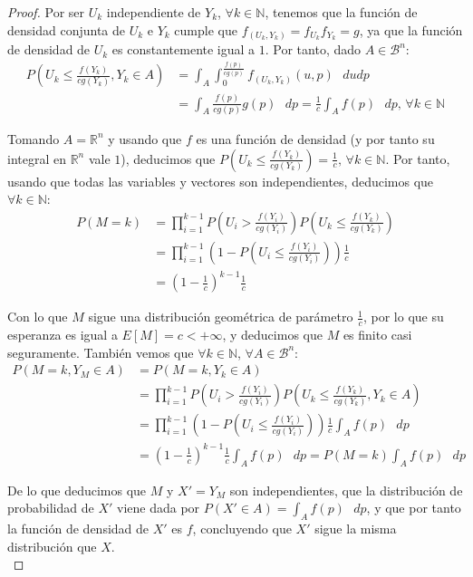 \begin{proof}
Por ser $U_k$ independiente de $Y_k$, $\forall k\in\mathds{N}$, tenemos que la función de densidad conjunta de $U_k$ e $Y_k$ cumple que $f_{(U_k,Y_k)}=f_{U_k}f_{Y_k} = g$, ya que la función de densidad de $U_k$ es constantemente igual a $1$. Por tanto, dado $A \in \mathscr{B}^n$:
\begin{align*}
P(U_k\leq \frac{f(Y_k)}{cg(Y_k)}, Y_k\in A) &= \int_{A} \int_0^{\frac{f(p)}{cg(p)}} f_{(U_k,Y_k)}(u,p)\text{ }dudp\\
&= \int_{A} \frac{f(p)}{cg(p)} g(p)\text{ } dp = \frac{1}{c}\int_{A} f(p)\text{ } dp  \text{, }\forall k\in\mathds{N}
\end{align*}

Tomando $A=\mathds{R}^n$ y usando que $f$ es una función de densidad (y por tanto su integral en $\mathds{R}^n$ vale $1$), deducimos que $P(U_k\leq \frac{f(Y_k)}{cg(Y_k)}) = \frac{1}{c}\text{, }\forall k\in\mathds{N}$. Por tanto, usando que todas las variables y vectores son independientes, deducimos que $\forall k\in\mathds{N}$:
\begin{align*}
P(M=k)&=\prod_{i=1}^{k-1}P(U_i > \frac{f(Y_i)}{cg(Y_i)}) P(U_k\leq \frac{f(Y_k)}{cg(Y_k)})\\
&=\prod_{i=1}^{k-1}(1-P(U_i \leq \frac{f(Y_i)}{cg(Y_i)})) \frac{1}{c}\\
&=(1-\frac{1}{c})^{k-1}\frac{1}{c}
\end{align*}

Con lo que $M$ sigue una distribución geométrica de parámetro $\frac{1}{c}$, por lo que su esperanza es igual a $E[M] = c < +\infty$, y deducimos que $M$ es finito casi seguramente. También vemos que $\forall k\in\mathds{N}$, $\forall A \in \mathscr{B}^n$:
\begin{align*}
P(M=k, Y_M\in A) &= P(M=k,Y_k\in A)\\
&=\prod_{i=1}^{k-1}P(U_i > \frac{f(Y_i)}{cg(Y_i)}) P(U_k\leq \frac{f(Y_k)}{cg(Y_k)}, Y_k\in A)\\
&=\prod_{i=1}^{k-1}(1-P(U_i \leq \frac{f(Y_i)}{cg(Y_i)})) \frac{1}{c}\int_{A} f(p)\text{ } dp\\
&=(1-\frac{1}{c})^{k-1}\frac{1}{c}\int_{A} f(p)\text{ } dp = P(M=k) \int_{A} f(p)\text{ } dp
\end{align*}

De lo que deducimos que $M$ y $X'=Y_M$ son independientes, que la distribución de probabilidad de $X'$ viene dada por $P(X'\in A) = \int_{A} f(p)\text{ } dp$, y que por tanto la función de densidad de $X'$ es $f$, concluyendo que $X'$ sigue la misma distribución que $X$.\\

\end{proof}

